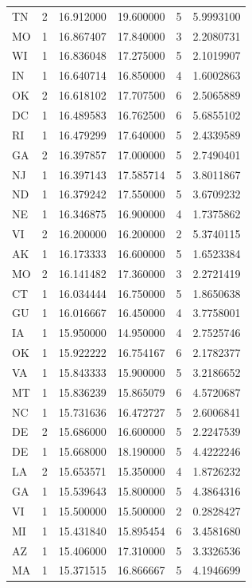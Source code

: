 \documentclass[
]{article}
\begin{document}
\begin{longtable}[t]{lrrrrr}
TN & 2 & 16.912000 & 19.600000 & 5 & 5.9993100\\
MO & 1 & 16.867407 & 17.840000 & 3 & 2.2080731\\
WI & 1 & 16.836048 & 17.275000 & 5 & 2.1019907\\
IN & 1 & 16.640714 & 16.850000 & 4 & 1.6002863\\
\addlinespace
OK & 2 & 16.618102 & 17.707500 & 6 & 2.5065889\\
DC & 1 & 16.489583 & 16.762500 & 6 & 5.6855102\\
RI & 1 & 16.479299 & 17.640000 & 5 & 2.4339589\\
GA & 2 & 16.397857 & 17.000000 & 5 & 2.7490401\\
NJ & 1 & 16.397143 & 17.585714 & 5 & 3.8011867\\
\addlinespace
ND & 1 & 16.379242 & 17.550000 & 5 & 3.6709232\\
NE & 1 & 16.346875 & 16.900000 & 4 & 1.7375862\\
VI & 2 & 16.200000 & 16.200000 & 2 & 5.3740115\\
AK & 1 & 16.173333 & 16.600000 & 5 & 1.6523384\\
MO & 2 & 16.141482 & 17.360000 & 3 & 2.2721419\\
\addlinespace
CT & 1 & 16.034444 & 16.750000 & 5 & 1.8650638\\
GU & 1 & 16.016667 & 16.450000 & 4 & 3.7758001\\
IA & 1 & 15.950000 & 14.950000 & 4 & 2.7525746\\
OK & 1 & 15.922222 & 16.754167 & 6 & 2.1782377\\
VA & 1 & 15.843333 & 15.900000 & 5 & 3.2186652\\
\addlinespace
MT & 1 & 15.836239 & 15.865079 & 6 & 4.5720687\\
NC & 1 & 15.731636 & 16.472727 & 5 & 2.6006841\\
DE & 2 & 15.686000 & 16.600000 & 5 & 2.2247539\\
DE & 1 & 15.668000 & 18.190000 & 5 & 4.4222246\\
LA & 2 & 15.653571 & 15.350000 & 4 & 1.8726232\\
\addlinespace
GA & 1 & 15.539643 & 15.800000 & 5 & 4.3864316\\
VI & 1 & 15.500000 & 15.500000 & 2 & 0.2828427\\
MI & 1 & 15.431840 & 15.895454 & 6 & 3.4581680\\
AZ & 1 & 15.406000 & 17.310000 & 5 & 3.3326536\\
MA & 1 & 15.371515 & 16.866667 & 5 & 4.1946699\\

\end{longtable}
\end{document}
